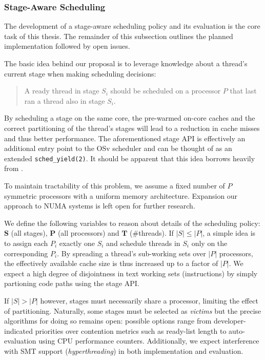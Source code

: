 \documentclass{article}
\begin{document}
\subsubsection{Stage-Aware Scheduling}\label{stageawaresched}

The development of a stage-aware scheduling policy and its evaluation is the core task of this thesis.
The remainder of this subsection outlines the planned implementation followed by open issues.

The basic idea behind our proposal is to leverage knowledge about a thread's current stage when making scheduling decisions:
\begin{quote} %
A ready thread in stage $S_i$ should be scheduled on a processor $P$ that last ran a thread also in stage $S_i$.
\end{quote}

By scheduling a stage on the same core, the pre-warmed on-core caches and the correct partitioning of the thread's stages
will lead to a reduction in cache misses and thus better performance.
The aforementioned stage API is effectively an additional entry point to the OSv scheduler and can be thought of as an
extended \texttt{sched\_yield(2)}.
It should be apparent that this idea borrows heavily from \cite{sodaspr,cohort}.

To maintain tractability of this problem, we assume a fixed number of $P$ symmetric processors with a uniform memory architecture.
Expansion our approach to NUMA systems is left open for further research.

We define the following variables to reason about details of the scheduling policy:
{$\mathbf{S}$} (all stages), $\mathbf{P}$ (all processors) and $\mathbf{T}$ (\#threads).
If $|S| \le |P|$, a simple idea is to assign each $P_i$ exactly one $S_i$ and schedule threads in $S_i$ only on the corresponding $P_i$.
By spreading a thread's sub-working sets over $|P|$ processors, the effectively available cache size is thus increased up to a factor
of $|P|$. We expect a high degree of disjointness in text working sets (instructions) by simply partioning code paths
using the stage API.

If $|S| > |P|$ however, stages must necessarily share a processor, limiting the effect of partitioning.
Naturally, some stages must be selected as \textit{victims} but the precise algorithms for doing so remains open:
possible options range from developer-indicated priorities over contention metrics such as ready-list length
to auto-evaluation using CPU performance counters.
Additionally, we expect interference with SMT support (\textit{hyperthreading}) in both implementation and evaluation.
\end{document}
